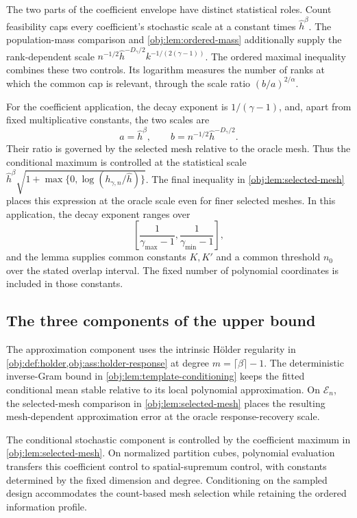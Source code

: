 \documentclass[11pt]{article}
\begin{document}
The two parts of the coefficient envelope have distinct statistical roles. Count feasibility caps every coefficient's stochastic scale at a constant times \(\widehat h^\beta\). The population-mass comparison and \cref{obj:lem:ordered-mass} additionally supply the rank-dependent scale
\(n^{-1/2}\widehat h^{-D_\gamma/2}k^{-1/(2(\gamma-1))}\).
The ordered maximal inequality combines these two controls. Its logarithm measures the number of ranks at which the common cap is relevant, through the scale ratio \((b/a)^{2/\alpha}\).

For the coefficient application, the decay exponent is \(1/(\gamma-1)\), and, apart from fixed multiplicative constants, the two scales are
\[
a=\widehat h^\beta,
\qquad
b=n^{-1/2}\widehat h^{-D_\gamma/2}.
\]
Their ratio is governed by the selected mesh relative to the oracle mesh. Thus the conditional maximum is controlled at the statistical scale
\(\widehat h^\beta\sqrt{1+\max\{0,\log(h_{\gamma,n}/\widehat h)\}}\).
The final inequality in \cref{obj:lem:selected-mesh} places this expression at the oracle scale even for finer selected meshes. In this application, the decay exponent ranges over
\[
\left[
\frac{1}{\gamma_{\max}-1},
\frac{1}{\gamma_{\min}-1}
\right],
\]
and the lemma supplies common constants \(K,K'\) and a common threshold \(n_0\) over the stated overlap interval. The fixed number of polynomial coordinates is included in those constants.

\subsection{The three components of the upper bound}

The approximation component uses the intrinsic Hölder regularity in \cref{obj:def:holder,obj:ass:holder-response} at degree \(m=\lceil\beta\rceil-1\). The deterministic inverse-Gram bound in \cref{obj:lem:template-conditioning} keeps the fitted conditional mean stable relative to its local polynomial approximation. On \(\mathcal E_n\), the selected-mesh comparison in \cref{obj:lem:selected-mesh} places the resulting mesh-dependent approximation error at the oracle response-recovery scale.

The conditional stochastic component is controlled by the coefficient maximum in \cref{obj:lem:selected-mesh}. On normalized partition cubes, polynomial evaluation transfers this coefficient control to spatial-supremum control, with constants determined by the fixed dimension and degree. Conditioning on the sampled design accommodates the count-based mesh selection while retaining the ordered information profile.
\end{document}
